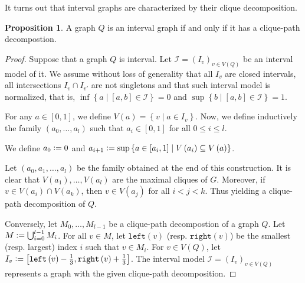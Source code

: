 \documentclass{article}
\theoremstyle{definition}
\newtheorem{prop}[thm]{Proposition}
\newcommand{\defeq}{\vcentcolon=}
\begin{document}
    It turns out that interval
    graphs are characterized by
    their clique decomposition.
    
    \begin{prop} \label{clique-path}
        A graph $Q$ is an 
        interval graph if and only if
        it has a clique-path decompostion.
    \end{prop}
    \begin{proof}
        Suppose that a graph $Q$ 
        is interval.
        Let $\mathcal{I} = \left(I_{v}\right)_{v \in V\left(Q\right)}$ 
        be an interval model of it.
        We assume without loss
        of generality that
        all $I_{v}$ are closed
        intervals, all intersections
        $I_{v} \cap I_{v'}$ are
        not singletons and that
        such interval model is
        normalized, that is,
        $\inf \left\{a \mid \left[a, b\right] \in \mathcal{I} \right\} = 0$
        and $\sup \left\{b \mid \left[a, b\right] \in \mathcal{I}\right\} = 1$.

        For any $a \in \left[0, 1\right]$, 
        we define $V\left(a\right) = \left\{v \mid a \in I_{v}\right\}$.
        Now, we define inductively the
        family $\left(a_0, \ldots, a_{l}\right)$ 
        such that $a_i \in \left[0, 1\right]$ 
        for all $0 \leq i \leq l$.

        We define $a_0 \defeq 0$ and
        $a_{i+1} \defeq \sup \left\{a \in \left[a_{i}, 1\right] \mid 
        V\left(a_{i}\right) \subseteq V\left(a\right)\right\}$.
        
        Let $\left(a_0, a_1, \ldots, a_{l}\right)$ 
        be the family obtained at 
        the end of this construction.
        It is clear that $V\left(a_1\right), \ldots, V\left(a_{l}\right)$ 
        are the maximal cliques of $G$.
        Moreover, if $v \in V\left(a_{i}\right) \cap V\left(a_{k}\right)$,
        then $v \in V\left(a_{j}\right)$
        for all $i < j < k$.
        Thus yielding a clique-path 
        decomposition of $Q$.

        Conversely, let $M_0, \ldots, M_{l-1}$ 
        be a clique-path decompostion
        of a graph $Q$. 
        Let $M \defeq \bigcup_{i=0}^{l-1} M_{i}$.
        For all $v \in M$,
        let $\texttt{left}\left(v\right)$
        (resp. $\texttt{right}\left(v\right)$)
        be the smallest
        (resp. largest) index $i$ 
        such that $v \in M_{i}$.
        For $v \in V\left(Q\right)$,
        let $I_{v} \defeq \left[\texttt{left}\left(v\right) - \frac{1}{3}, 
        \texttt{right}\left(v\right) + \frac{1}{3}\right]$.
        The interval model $\mathcal{I} = \left(I_{v}\right)_{v \in V\left(Q\right)}$
        represents a graph with the
        given clique-path decomposition.
    \end{proof}
\end{document}
